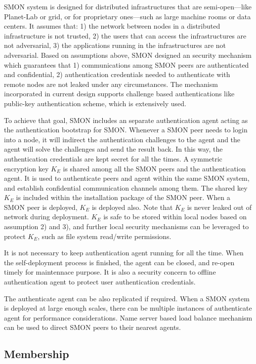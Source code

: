 SMON system is designed for distributed infrastructures that
are semi-open---like Planet-Lab or grid, or for proprietary
ones---such as large machine rooms or data centers. It
assumes that: 1) the network between nodes in a distributed
infrastructure is not trusted, 2) the users that can access
the infrastructures are not adversarial, 3) the applications
running in the infrastructures are not adversarial. Based on
assumptions above, SMON designed an security mechanism which
guarantees that 1) communications among SMON peers are
authenticated and confidential, 2) authentication
credentials needed to authenticate with remote nodes are not
leaked under any circumstances. The mechanism incorporated
in current design supports challenge based authentications
like public-key authentication scheme, which is extensively
used.

To achieve that goal, SMON includes an separate
authentication agent acting as the authentication bootstrap
for SMON.  Whenever a SMON peer needs to login into a node,
it will indirect the authentication challenges to the agent
and the agent will solve the challenges and send the result
back. In this way, the authentication credentials are kept
secret for all the times. A symmetric encryption key $K_E$
is shared among all the SMON peers and the authentication
agent. It is used to authenticate peers and agent within the
same SMON system, and establish confidential communication
channels among them. The shared key $K_E$ is included within
the installation package of the SMON peer. When a SMON peer
is deployed, $K_E$ is deployed also. Note that $K_E$ is
never leaked out of network during deployment. $K_E$ is safe
to be stored within local nodes based on assumption 2) and
3), and further local security mechanisms can be leveraged
to protect $K_E$, such as file system read/write
permissions.

It is not necessary to keep authentication agent running for
all the time.  When the self-deployment process is finished,
the agent can be closed, and re-open timely for maintennace
purpose.  It is also a security concern to offline
authentication agent to protect user authentication
credentials.

The authenticate agent can be also replicated if required.
When a SMON system is deployed at large enough scales, there
can be multiple instances of authenticate agent for
performance considerations. Name server based load balance
mechanism\cite{} can be used to direct SMON peers to their nearest
agents.

\subsection{Membership}

